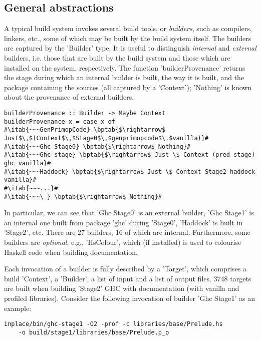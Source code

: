 \subsection{General abstractions}

A typical build system invokes several build tools, or \emph{builders}, such as
compilers, linkers, etc., some of which may be built by the
build system itself. The builders are captured by the \lst'Builder' type. It
is useful to distinguish \emph{internal} and \emph{external} builders, i.e.
those that are built by the build system and those which are installed on the
system, respectively. The function \lst'builderProvenance' returns the stage
during which an internal builder is built, the way it is built, and the package
containing the sources (all captured by a \lst'Context'); \lst'Nothing' is
known about the provenance of external builders.

\newcommand{\bptab}[1]{\hspace{.143\textwidth}\rlap{#1}}

\begin{lstlisting}
builderProvenance :: Builder -> Maybe Context
builderProvenance x = case x of
#\itab{~~~GenPrimopCode} \bptab{$\rightarrow$ Just$\,$(Context$\,$Stage0$\,$genprimopcode$\,$vanilla)}#
#\itab{~~~Ghc Stage0} \bptab{$\rightarrow$ Nothing}#
#\itab{~~~Ghc stage} \bptab{$\rightarrow$ Just \$ Context (pred stage) ghc vanilla}#
#\itab{~~~Haddock} \bptab{$\rightarrow$ Just \$ Context Stage2 haddock vanilla}#
#\itab{~~~...}#
#\itab{~~~\_} \bptab{$\rightarrow$ Nothing}#
\end{lstlisting}

\noindent In particular, we can see that \lst'Ghc Stage0' is an external
builder, \lst'Ghc Stage1' is an internal one built from package \lst'ghc'
during \lst'Stage0', \lst'Haddock' is built in \lst'Stage2', etc. There are
27 builders, 16 of which are internal. Furthermore, some builders are
\emph{optional}, e.g., \lst'HsColour', which (if installed) is used to
colourise Haskell code when building documentation.

Each invocation of a builder is fully described by a \lst'Target', which
comprises a build \lst'Context', a \lst'Builder', a list of input and
a list of output files. 3748 targets are built when building \lst'Stage2' GHC
with documentation (with vanilla and profiled libraries). Consider the following
invocation of builder \lst'Ghc Stage1' as an example:

\begin{lstlisting}
inplace/bin/ghc-stage1 -O2 -prof -c libraries/base/Prelude.hs
    -o build/stage1/libraries/base/Prelude.p_o
\end{lstlisting}

